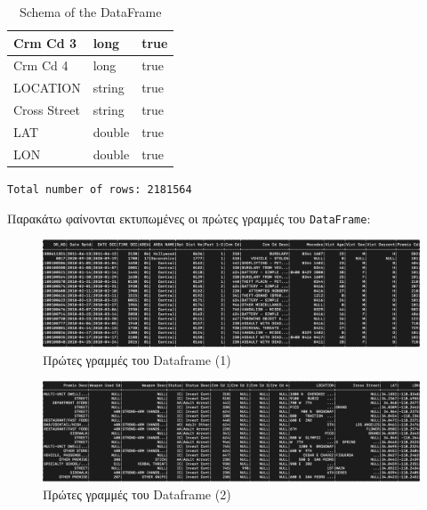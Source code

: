 \documentclass{article}
\begin{document}
\begin{table}[h]
\begin{tabular}{|l|l|l|}
Crm Cd 3            & long          & true              \\ \hline
Crm Cd 4            & long          & true              \\ \hline
LOCATION            & string        & true              \\ \hline
Cross Street        & string        & true              \\ \hline
LAT                 & double        & true              \\ \hline
LON                 & double        & true              \\ \hline
\end{tabular}
\caption{Schema of the DataFrame}
\label{table:schema}
\end{table}


 \texttt{Total number of rows: 2181564}



Παρακάτω φαίνονται εκτυπωμένες οι πρώτες γραμμές του \texttt{DataFrame}:
\begin{figure}[h]
    \centering
    \includegraphics[width=1\linewidth]{df20rowsA.png}
    \caption{Πρώτες γραμμές του  Dataframe (1)}
    \label{fig:df20rowsA}
\end{figure}

\begin{figure}[h]
    \centering
    \includegraphics[width=1\linewidth]{df20rowsB.png}
    \caption{Πρώτες γραμμές του  Dataframe (2)}
    \label{fig:df20rowsB}
\end{figure}

\end{document}
